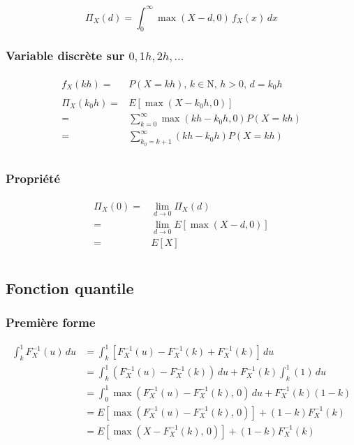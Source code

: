 \[
    \Pi_X(d) = \int_0^\infty \max(X-d, 0)\,f_X(x)\,dx
\]

\subsubsection*{Variable discrète sur ${0,1h,2h,\dots}$}\label{variable-discrete-sur-01h2hdots}

\begin{gather*}
\begin{align*}
f_X(kh) =& P(X=kh),\, k\in \mathrm{N},\, h > 0,\, d =k_0 h\\
\\
\Pi_X(k_0 h) =& E[\max(X-k_0 h, 0)]\\
=&\sum_{k=0}^\infty \max(kh-k_0 h, 0) P(X=kh)\\
=&\sum_{k_0=k+1}^\infty (kh-k_0 h) P(X=kh)\\
\end{align*}
\end{gather*}

\subsubsection*{Propriété}\label{propriete}

\begin{gather*}
\begin{align*}
\Pi_X(0) =& \lim_{d \to 0} \Pi_X(d)\\
=& \lim_{d \to 0} E[\max(X-d, 0)]\\
=& E[X] \\
\end{align*}
\end{gather*}

\subsection{Fonction quantile}\label{intro:fn-quantile}

\subsubsection*{Première forme}\label{intro:fn-quantile:1}

\begin{align*}
\int_k^1 F_X^{-1}(u)\,du& =\int_k^1 \left[F_X^{-1}(u)-F_X^{-1}(k)+F_X^{-1}(k)\right]\,du\\
& =\int_k^1\left(F_X^{-1}(u)-F_X^{-1}(k)\right)\,du + F_X^{-1}(k)\int_k^1 (1)\,du\\
& =\int_0^1\max\left(F_X^{-1}(u)-F_X^{-1}(k),\, 0\right)\, du + F_X^{-1}(k)(1-k)\\
& = E\left[\max(F_X^{-1}(u)-F_X^{-1}(k),\, 0)\right]+(1-k)F_X^{-1}(k)\\
& = E\left[\max(X-F_X^{-1}(k),\, 0)\right]+(1-k)F_X^{-1}(k)
\end{align*}

